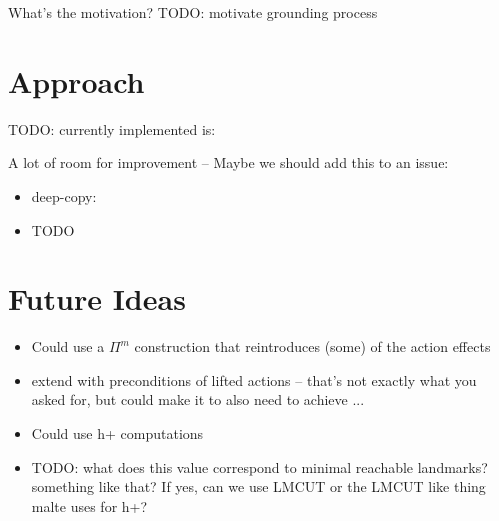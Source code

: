 \documentclass[twocolumn]{article}
\newcommand{\task}{\ensuremath{\Pi}\xspace}
\begin{document}
	What's the motivation?
	TODO: motivate grounding process 
	
	\section{Approach}
	
	TODO: currently implemented is:
	
	
	A lot of room for improvement -- Maybe we should add this to an issue:
	\begin{itemize}
		\item deep-copy:
		\item TODO
	\end{itemize}
		
	\section{Future Ideas}
	
	\begin{itemize}
		\item Could use a $\task^{m}$ construction that reintroduces (some) of the action effects
		\item extend with preconditions of lifted actions -- that's not exactly what you asked for, but could make it to also need to achieve ... 
		\item Could use h+ computations
		\item 
		TODO: what does this value correspond to minimal reachable landmarks? something like that? If yes, can we use LMCUT or the LMCUT like thing malte uses for h+?
	\end{itemize}
	
	
\end{document}
